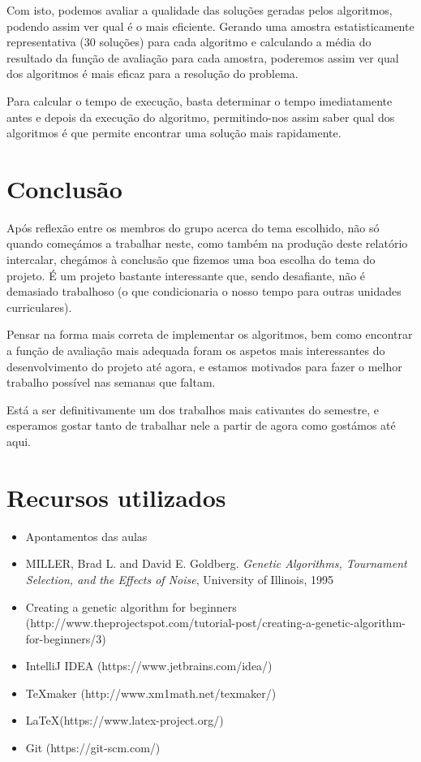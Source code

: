 \documentclass[11pt,a4paper,reqno]{article}
\numberwithin{equation}{section}
\begin{document}
Com isto, podemos avaliar a qualidade das soluções geradas pelos algoritmos, podendo assim ver qual é o mais eficiente. Gerando uma amostra estatisticamente representativa (30 soluções) para cada algoritmo e calculando a média do resultado da função de avaliação para cada amostra, poderemos assim ver qual dos algoritmos é mais eficaz para a resolução do problema.

Para calcular o tempo de execução, basta determinar o tempo imediatamente antes e depois da execução do algoritmo, permitindo-nos assim saber qual dos algoritmos é que permite encontrar uma solução mais rapidamente.



\newpage

\section{Conclusão}
Após reflexão entre os membros do grupo acerca do tema escolhido, não só quando começámos a trabalhar neste, como também na produção deste relatório intercalar, chegámos à conclusão que fizemos uma boa escolha do tema do projeto. É um projeto bastante interessante que, sendo desafiante, não é demasiado trabalhoso (o que condicionaria o nosso tempo para outras unidades curriculares).

Pensar na forma mais correta de implementar os algoritmos, bem como encontrar a função de avaliação mais adequada foram os aspetos mais interessantes do desenvolvimento do projeto até agora, e estamos motivados para fazer o melhor trabalho possível nas semanas que faltam.

Está a ser definitivamente um dos trabalhos mais cativantes do semestre, e esperamos gostar tanto de trabalhar nele a partir de agora como gostámos até aqui.


\newpage

\section{Recursos utilizados}

\begin{itemize}
\item Apontamentos das aulas
\item MILLER, Brad L. and David E. Goldberg. \textit{Genetic Algorithms, Tournament Selection, and the Effects of Noise}, University of Illinois, 1995\item Creating a genetic algorithm for beginners (http://www.theprojectspot.com/tutorial-post/creating-a-genetic-algorithm-for-beginners/3)
\item IntelliJ IDEA (https://www.jetbrains.com/idea/)
\item TeXmaker (http://www.xm1math.net/texmaker/)
\item LaTeX(https://www.latex-project.org/)
\item Git (https://git-scm.com/)

\end{itemize}
\end{document}
